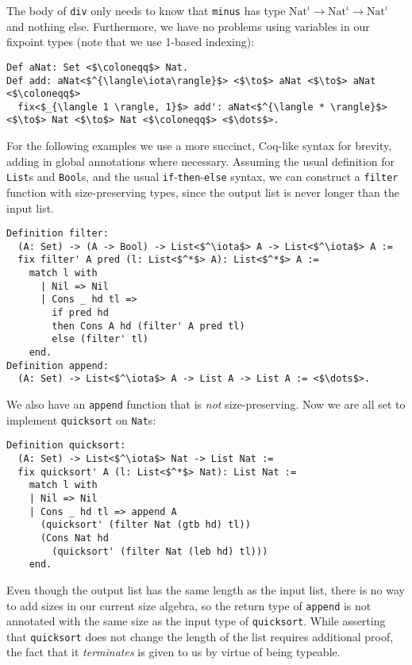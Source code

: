 \documentclass[nonacm,screen,10pt]{acmart}
\begin{document}
The body of \texttt{div} only needs to know that \texttt{minus} has type $\text{Nat}^\iota \to \text{Nat}^\iota \to \text{Nat}^\iota$ and nothing else. Furthermore, we have no problems using variables in our fixpoint types (note that we use 1-based indexing):

\begin{verbatim}
Def aNat: Set <$\coloneqq$> Nat.
Def add: aNat<$^{\langle\iota\rangle}$> <$\to$> aNat <$\to$> aNat <$\coloneqq$>
  fix<$_{\langle 1 \rangle, 1}$> add': aNat<$^{\langle * \rangle}$> <$\to$> Nat <$\to$> Nat <$\coloneqq$> <$\dots$>.
\end{verbatim}

For the following examples we use a more succinct, Coq-like syntax for brevity, adding in global annotations where necessary. Assuming the usual definition for \texttt{List}s and \texttt{Bool}s, and the usual \texttt{if}-\texttt{then}-\texttt{else} syntax, we can construct a \texttt{filter} function with size-preserving types, since the output list is never longer than the input list.

\begin{verbatim}
Definition filter:
  (A: Set) -> (A -> Bool) -> List<$^\iota$> A -> List<$^\iota$> A :=
  fix filter' A pred (l: List<$^*$> A): List<$^*$> A :=
    match l with
      | Nil => Nil
      | Cons _ hd tl =>
        if pred hd
        then Cons A hd (filter' A pred tl)
        else (filter' tl)
    end.
Definition append:
  (A: Set) -> List<$^\iota$> A -> List A -> List A := <$\dots$>.
\end{verbatim}

We also have an \texttt{append} function that is \textit{not} size-preserving. Now we are all set to implement \texttt{quicksort} on \texttt{Nat}s:

\begin{verbatim}
Definition quicksort:
  (A: Set) -> List<$^\iota$> Nat -> List Nat :=
  fix quicksort' A (l: List<$^*$> Nat): List Nat :=
    match l with
    | Nil => Nil
    | Cons _ hd tl => append A
      (quicksort' (filter Nat (gtb hd) tl))
      (Cons Nat hd
        (quicksort' (filter Nat (leb hd) tl)))
    end.
\end{verbatim}
Even though the output list has the same length as the input list, there is no way to add sizes in our current size algebra, so the return type of \texttt{append} is not annotated with the same size as the input type of \texttt{quicksort}. While asserting that \texttt{quicksort} does not change the length of the list requires additional proof, the fact that it \textit{terminates} is given to us by virtue of being typeable.
\end{document}
